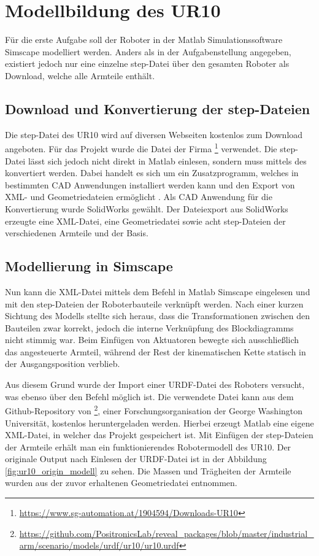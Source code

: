\section{Modellbildung des UR10}

Für die erste Aufgabe soll der Roboter in der Matlab Simulationssoftware Simscape modelliert werden.
Anders als in der Aufgabenstellung angegeben, existiert jedoch nur eine einzelne step-Datei über den gesamten Roboter als Download, welche alle Armteile enthält.


\subsection{Download und Konvertierung der step-Dateien}
Die step-Datei des UR10 wird auf diversen Webseiten kostenlos zum Download angeboten.
Für das Projekt wurde die Datei der Firma \footnote{\url{https://www.sg-automation.at/1904594/Downloads-UR10}} verwendet.
Die step-Datei lässt sich jedoch nicht direkt in Matlab einlesen, sondern muss mittels des  konvertiert werden.
Dabei handelt es sich um ein Zusatzprogramm, welches in bestimmten CAD Anwendungen installiert werden kann und den Export von XML- und Geometriedateien ermöglicht \cite{sm_plugin}.
Als CAD Anwendung für die Konvertierung wurde SolidWorks gewählt. 
Der Dateiexport aus SolidWorks erzeugte eine XML-Datei, eine Geometriedatei  sowie acht step-Dateien der verschiedenen Armteile und der Basis.


\subsection{Modellierung in Simscape}

Nun kann die XML-Datei mittels dem Befehl  in Matlab Simscape eingelesen und mit den step-Dateien der Roboterbauteile verknüpft werden.
Nach einer kurzen Sichtung des Modells stellte sich heraus, dass die Transformationen zwischen den Bauteilen zwar korrekt, jedoch die interne Verknüpfung des Blockdiagramms nicht stimmig war.
Beim Einfügen von Aktuatoren bewegte sich ausschließlich das angesteuerte Armteil, während der Rest der kinematischen Kette statisch in der Ausgangsposition verblieb. 

Aus diesem Grund wurde der Import einer URDF-Datei des Roboters versucht, was ebenso über den Befehl  möglich ist.
Die verwendete Datei kann aus dem Github-Repository von \footnote{\url{https://github.com/PositronicsLab/reveal_packages/blob/master/industrial_arm/scenario/models/urdf/ur10/ur10.urdf}}, einer Forschungsorganisation der George Washington Universität, kostenlos heruntergeladen werden.
Hierbei erzeugt Matlab eine eigene XML-Datei, in welcher das Projekt gespeichert ist.
Mit Einfügen der step-Dateien der Armteile erhält man ein funktionierendes Robotermodell des UR10. 
Der originale Output nach Einlesen der URDF-Datei ist in der Abbildung \ref{fig:ur10_origin_modell} zu sehen.
Die Massen und Trägheiten der Armteile wurden aus der zuvor erhaltenen Geometriedatei entnommen.


